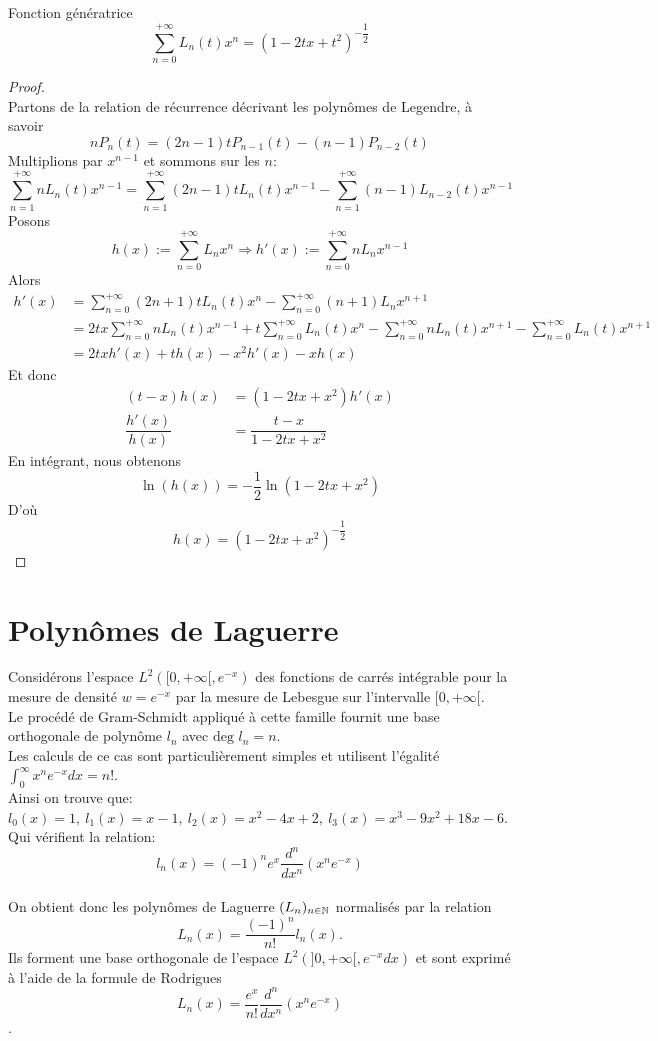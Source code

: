 \bprop
Fonction génératrice
$$\sum\limits_{n=0}^{+\infty}L_n(t)x^n = (1-2tx+t^2)^{-\dfrac{1}{2}}$$
\eprop
\begin{proof}
$ $\\Partons de la relation de récurrence décrivant les polynômes de Legendre, à savoir $$nP_n(t)=(2n-1)tP_{n-1}(t)-(n-1)P_{n-2}(t)$$
Multiplions par $x^{n-1}$ et sommons sur les $n$:
$$\sum\limits_{n=1}^{+\infty}nL_n(t)x^{n-1}=\sum\limits_{n=1}^{+\infty}(2n-1)tL_n(t)x^{n-1} - \sum\limits_{n=1}^{+\infty}(n-1)L_{n-2}(t)x^{n-1}$$
Posons $$h(x):=\sum\limits_{n=0}^{+\infty}L_nx^{n} \Rightarrow h'(x):=\sum\limits_{n=0}^{+\infty}nL_nx^{n-1}$$
Alors
\begin{align*}
h'(x) &= \sum\limits_{n=0}^{+\infty}(2n+1)tL_n(t)x^{n} - \sum\limits_{n=0}^{+\infty}(n+1)L_nx^{n+1}\\
&= 2tx\sum\limits_{n=0}^{+\infty}nL_n(t)x^{n-1} + t\sum\limits_{n=0}^{+\infty}L_n(t)x^{n} - \sum\limits_{n=0}^{+\infty}nL_n(t)x^{n+1}-\sum\limits_{n=0}^{+\infty}L_n(t)x^{n+1}\\
&=2txh'(x)+th(x)-x^{2}h'(x)-xh(x)
\end{align*}
Et donc
\begin{align*}
(t-x)h(x) &= (1-2tx+x^2)h'(x)\\
\dfrac{h'(x)}{h(x)} &= \dfrac{t-x}{1-2tx+x^2}
\end{align*}
En intégrant, nous obtenons
$$\ln (h(x))= -\dfrac{1}{2} \ln (1-2tx+x^2)$$
D'où
$$h(x)= (1-2tx+x^2)^{-\dfrac{1}{2}}$$
\end{proof}

\section{Polynômes de Laguerre}
Considérons l'espace $L^2([0,+\infty[,e^{-x})$ des fonctions de carrés intégrable pour la mesure de densité $w=e^{-x}$ par la mesure de Lebesgue sur l'intervalle $[0,+\infty[$.
\\Le procédé de Gram-Schmidt appliqué à cette famille fournit une base orthogonale de polynôme $l_n$ avec $\text{deg }l_n=n$.
\\Les calculs de ce cas sont particulièrement simples et utilisent l'égalité $\displaystyle{\int_0^\infty x^n e^{-x} dx=n!}$.
\\$ $\\Ainsi on trouve que: $l_0(x)=1,\ l_1(x)=x-1,\ l_2(x)=x^2-4x+2,\ l_3(x)= x^3-9x^2+18x-6$. Qui vérifient la relation:
$$l_n(x)= (-1)^n e^x \dfrac{d^n}{dx^n}(x^n e^{-x})$$
\\On obtient donc les polynômes de Laguerre $(L_n)_{n\in\mathbb N}$ normalisés par la relation $$L_n(x)=\frac{(-1)^n}{n!}l_n(x).$$
Ils forment une base orthogonale de l'espace $L^2(]0,+\infty[,e^{-x}dx)$ et sont exprimé à l'aide de la formule de Rodrigues $$L_n(x)= \dfrac{e^x}{n!} \dfrac{d^n}{dx^n}(x^n e^{-x})$$.

